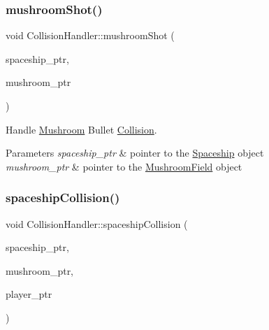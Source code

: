 \subsubsection{\texorpdfstring{mushroom\+Shot()}{mushroomShot()}}
{\footnotesize\ttfamily void Collision\+Handler\+::mushroom\+Shot (\begin{DoxyParamCaption}\item[{shared\+\_\+ptr$<$ \mbox{\hyperlink{class_spaceship}{Spaceship}} $>$}]{spaceship\+\_\+ptr,  }\item[{shared\+\_\+ptr$<$ \mbox{\hyperlink{class_mushroom_field}{Mushroom\+Field}} $>$}]{mushroom\+\_\+ptr }\end{DoxyParamCaption})}



Handle \mbox{\hyperlink{class_mushroom}{Mushroom}} Bullet \mbox{\hyperlink{class_collision}{Collision}}. 


\begin{DoxyParams}{Parameters}
{\em spaceship\+\_\+ptr} & pointer to the \mbox{\hyperlink{class_spaceship}{Spaceship}} object \\
\hline
{\em mushroom\+\_\+ptr} & pointer to the \mbox{\hyperlink{class_mushroom_field}{Mushroom\+Field}} object \\
\hline
\end{DoxyParams}
\mbox{\label{class_collision_handler_a709eb0dd73f96ce7aff7fbd7deaa8355}} 
\subsubsection{\texorpdfstring{spaceship\+Collision()}{spaceshipCollision()}}
{\footnotesize\ttfamily void Collision\+Handler\+::spaceship\+Collision (\begin{DoxyParamCaption}\item[{shared\+\_\+ptr$<$ \mbox{\hyperlink{class_spaceship}{Spaceship}} $>$}]{spaceship\+\_\+ptr,  }\item[{shared\+\_\+ptr$<$ \mbox{\hyperlink{class_mushroom_field}{Mushroom\+Field}} $>$}]{mushroom\+\_\+ptr,  }\item[{shared\+\_\+ptr$<$ \mbox{\hyperlink{class_player}{Player}} $>$}]{player\+\_\+ptr }\end{DoxyParamCaption})}



